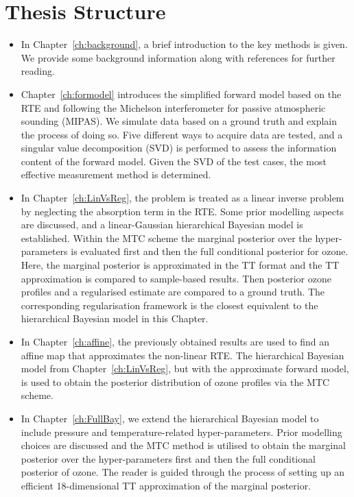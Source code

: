 \section{Thesis Structure}
\begin{itemize}
	\item In Chapter~\ref{ch:background}, a brief introduction to the key methods is given. We provide some background information along with references for further reading.
	\item Chapter~\ref{ch:formodel} introduces the simplified forward model based on the RTE and following the Michelson interferometer for passive atmospheric sounding (MIPAS).
	We simulate data based on a ground truth and explain the process of doing so.
	Five different ways to acquire data are tested, and a singular value decomposition (SVD) is performed to assess the information content of the forward model.
	Given the SVD of the test cases, the most effective measurement method is determined.
	\item In Chapter~\ref{ch:LinVsReg}, the problem is treated as a linear inverse problem by neglecting the absorption term in the RTE. Some prior modelling aspects are discussed, and a linear-Gaussian hierarchical Bayesian model is established.
	Within the MTC scheme the marginal posterior over the hyper-parameters is evaluated first and then the full conditional posterior for ozone.
	Here, the marginal posterior is approximated in the TT format and the TT approximation is compared to sample-based results.
	Then posterior ozone profiles and a regularised estimate are compared to a ground truth.
	The corresponding regularisation framework is the closest equivalent to the hierarchical Bayesian model in this Chapter.
	\item In Chapter~\ref{ch:affine}, the previously obtained results are used to find an affine map that approximates the non-linear RTE. The hierarchical Bayesian model from Chapter~\ref{ch:LinVsReg}, but with the approximate forward model, is used to obtain the posterior distribution of ozone profiles via the MTC scheme.
	\item In Chapter~\ref{ch:FullBay}, we extend the hierarchical Bayesian model to include pressure and temperature-related hyper-parameters.
	Prior modelling choices are discussed and the MTC method is utilised to obtain the marginal posterior over the hyper-parameters first and then the full conditional posterior of ozone.
	The reader is guided through the process of setting up an efficient 18-dimensional TT approximation of the marginal posterior.

\end{itemize}
